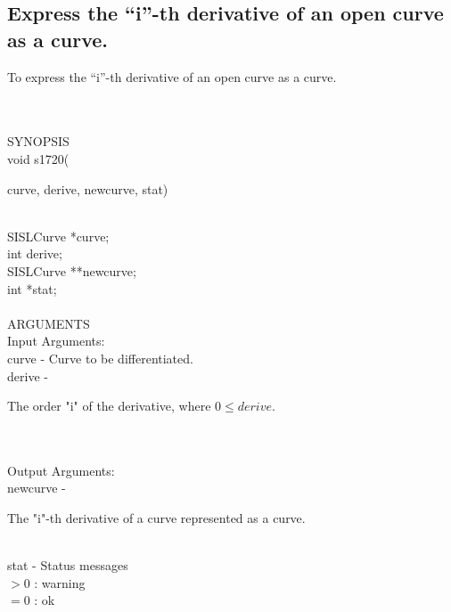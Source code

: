 \subsection{Express the ``i''-th derivative of an open curve as a curve.}
\begin{minipg1}
To express the ``i''-th derivative of an open curve as a curve.
\end{minipg1} \\ \\
SYNOPSIS\\
        \>void s1720(\begin{minipg3}
        {\fov curve}, {\fov derive}, {\fov newcurve}, {\fov stat})
                \end{minipg3}\\[0.3ex]
                \>\>    SISLCurve       \>      *{\fov curve};\\
                \>\>    int     \>      {\fov derive};\\
                \>\>    SISLCurve       \>      **{\fov newcurve};\\
                \>\>    int     \>      *{\fov stat};\\
\\
ARGUMENTS\\
        \>Input Arguments:\\
        \>\>    {\fov curve}    \> - \> Curve to be differentiated.\\
        \>\>    {\fov derive}   \> - \> \begin{minipg2}
                                The order "i" of the derivative, where
                                $0 \leq derive $.
                                \end{minipg2}\\
\\
        \>Output Arguments:\\
        \>\>    {\fov newcurve}\> - \>\begin{minipg2}
                                The "i"-th derivative of a curve
                                represented as a curve.
                                \end{minipg2}\\[0.8ex]
        \>\>    {\fov stat}     \> - \> Status messages\\
                \>\>\>\>\>              $> 0$   : warning\\
                \>\>\>\>\>              $= 0$   : ok\\
